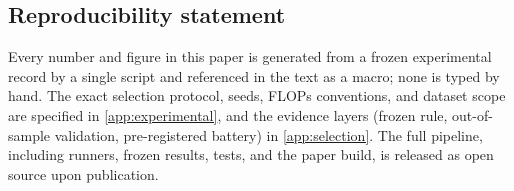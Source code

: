 \documentclass[10pt,letterpaper]{article}
\begin{document}
\subsection*{Reproducibility statement}
Every number and figure in this paper is generated from a frozen
experimental record by a single script and referenced in the text as a
macro; none is typed by hand. The exact selection protocol, seeds,
FLOPs conventions, and dataset scope are specified in
\cref{app:experimental}, and the evidence layers (frozen rule,
out-of-sample validation, pre-registered battery) in
\cref{app:selection}. The full pipeline, including runners, frozen
results, tests, and the paper build, is released as open source upon
publication.




\appendix






\end{document}
